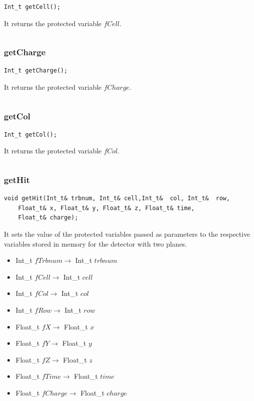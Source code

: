 \documentclass[a4paper]{book}
\begin{document}
\begin{lstlisting}
Int_t getCell();
\end{lstlisting}

It returns the protected variable $fCell$.

\[\]

\subsubsection{getCharge}

\begin{lstlisting}
Int_t getCharge();
\end{lstlisting}

It returns the protected variable $fCharge$.

\[\]

\subsubsection{getCol}

\begin{lstlisting}
Int_t getCol();
\end{lstlisting}

It returns the protected variable $fCol$.

\[\]

\subsubsection{getHit}

\begin{lstlisting}
void getHit(Int_t& trbnum, Int_t& cell,Int_t&  col, Int_t&  row,
	Float_t& x, Float_t& y, Float_t& z, Float_t& time,
	Float_t& charge);
\end{lstlisting}

It sets the value of the protected variables passed as parameters to the respective variables stored in memory for the detector with two planes.

\begin{itemize}
	\item Int\_t $fTrbnum \rightarrow$ Int\_t $trbnum$
	\item Int\_t $fCell \rightarrow$ Int\_t $cell$
	\item Int\_t $fCol \rightarrow$ Int\_t $col$
	\item Int\_t $fRow \rightarrow$ Int\_t $row$
	\item Float\_t $fX \rightarrow$ Float\_t $x$
	\item Float\_t $fY \rightarrow$ Float\_t $y$
	\item Float\_t $fZ \rightarrow$ Float\_t $z$
	\item Float\_t $fTime \rightarrow$ Float\_t $time$
	\item Float\_t $fCharge \rightarrow$ Float\_t $charge$
\end{itemize}
\end{document}
